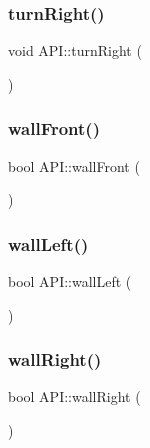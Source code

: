 \subsubsection{\texorpdfstring{turn\+Right()}{turnRight()}}
{\footnotesize\ttfamily void A\+P\+I\+::turn\+Right (\begin{DoxyParamCaption}{ }\end{DoxyParamCaption})\hspace{0.3cm}{\ttfamily [static]}}

\mbox{\label{class_a_p_i_a3452beb4232e7960ffdb8c0d4a1f0d30}} 
\subsubsection{\texorpdfstring{wall\+Front()}{wallFront()}}
{\footnotesize\ttfamily bool A\+P\+I\+::wall\+Front (\begin{DoxyParamCaption}{ }\end{DoxyParamCaption})\hspace{0.3cm}{\ttfamily [static]}}

\mbox{\label{class_a_p_i_a43b1e7f9b91aba577078af681c7807b3}} 
\subsubsection{\texorpdfstring{wall\+Left()}{wallLeft()}}
{\footnotesize\ttfamily bool A\+P\+I\+::wall\+Left (\begin{DoxyParamCaption}{ }\end{DoxyParamCaption})\hspace{0.3cm}{\ttfamily [static]}}

\mbox{\label{class_a_p_i_acdc812c3acadeb2890691e6c95a89816}} 
\subsubsection{\texorpdfstring{wall\+Right()}{wallRight()}}
{\footnotesize\ttfamily bool A\+P\+I\+::wall\+Right (\begin{DoxyParamCaption}{ }\end{DoxyParamCaption})\hspace{0.3cm}{\ttfamily [static]}}

